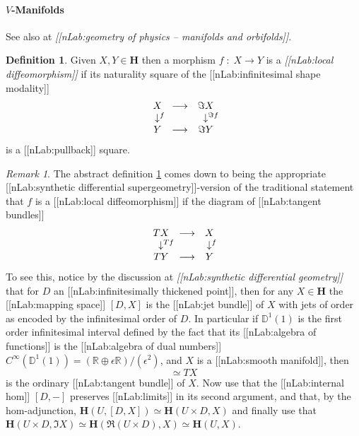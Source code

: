 \documentclass[12pt,titlepage]{article}
\def\mathrlap{\mathpalette\mathrlapinternal}
\def\mathrlapinternal#1#2{\rlap{$\mathsurround=0pt#1{#2}$}}
\newcommand{\itexarray}[1]{\begin{matrix}#1\end{matrix}}
\theoremstyle{plain}
\theoremstyle{definition}
\newtheorem{defn}{Definition}
\theoremstyle{remark}
\newtheorem{remark}{Remark}
\begin{document}
\hypertarget{Manifolds}{}\paragraph*{{$V$-Manifolds}}\label{Manifolds}
See also at \emph{[[nLab:geometry of physics -- manifolds and orbifolds]]}.
\begin{defn}
\label{LocalDiffeomorphisms}\hypertarget{LocalDiffeomorphisms}{}
Given $X,Y\in \mathbf{H}$ then a morphism $f \;\colon\; X\longrightarrow Y$ is a \emph{[[nLab:local diffeomorphism]]} if its naturality square of the [[nLab:infinitesimal shape modality]]
\begin{displaymath}
\itexarray{
    X &\longrightarrow& \Im X
    \\
    \downarrow^{\mathrlap{f}} && \downarrow^{\mathrlap{\Im f}}
    \\
    Y &\longrightarrow& \Im Y
  }
\end{displaymath}
is a [[nLab:pullback]] square.
\end{defn}
\begin{remark}
\label{}\hypertarget{}{}
The abstract definition \ref{LocalDiffeomorphisms} comes down to being the appropriate [[nLab:synthetic differential supergeometry]]-version of the traditional statement that $f$ is a [[nLab:local diffeomorphism]] if the diagram of [[nLab:tangent bundles]]
\begin{displaymath}
\itexarray{
    T X &\longrightarrow& X
    \\
    \downarrow^{\mathrlap{T f}} && \downarrow^{\mathrlap{f}}
    \\
    T Y &\longrightarrow& Y
  }
\end{displaymath}
To see this, notice by the discussion at \emph{[[nLab:synthetic differential geometry]]} that for $D$ an [[nLab:infinitesimally thickened point]], then for any $X \in \mathbf{H}$ the [[nLab:mapping space]] $[D,X]$ is the [[nLab:jet bundle]] of $X$ with jets of order as encoded by the infinitesimal order of $D$. In particular if $\mathbb{D}^1(1)$ is the first order infinitesimal interval defined by the fact that its [[nLab:algebra of functions]] is the [[nLab:algebra of dual numbers]] $C^\infty(\mathbb{D}^1(1)) = (\mathbb{R} \oplus \epsilon \mathbb{R})/(\epsilon^2)$, and $X$ is a [[nLab:smooth manifold]], then
\begin{displaymath}
[\mathbb{D}^1(1), X]\simeq T X
\end{displaymath}
is the ordinary [[nLab:tangent bundle]] of $X$. Now use that the [[nLab:internal hom]] $[D,-]$ preserves [[nLab:limits]] in its second argument, and that, by the hom-adjunction, $\mathbf{H}(U, [D,X]) \simeq \mathbf{H}(U \times D, X)$ and finally use that $\mathbf{H}(U \times D, \Im X)\simeq \mathbf{H}(\Re(U \times D), X)\simeq \mathbf{H}(U,X)$.
\end{remark}
\end{document}
